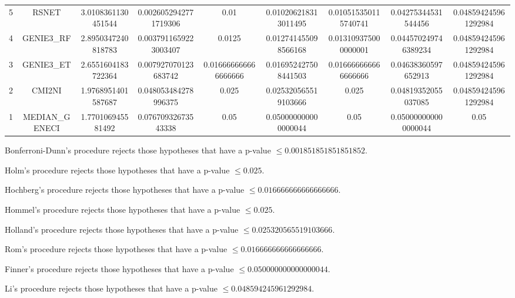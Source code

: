 \documentclass[a4paper,10pt]{article}
\begin{document}
\begin{landscape}
\begin{table}[!htp]
\begin{tabular}{ccccccccc}
5&RSNET&3.0108361130451544&0.0026052942771719306&0.01&0.010206218313011495&0.010515350115740741&0.04275344531544456&0.048594245961292984\\
4&GENIE3_RF&2.8950347240818783&0.0037911659223003407&0.0125&0.012741455098566168&0.013109375000000001&0.044570249746389234&0.048594245961292984\\
3&GENIE3_ET&2.6551604183722364&0.007927070123683742&0.016666666666666666&0.016952427508441503&0.016666666666666666&0.04638360597652913&0.048594245961292984\\
2&CMI2NI&1.9768951401587687&0.048053484278996375&0.025&0.025320565519103666&0.025&0.04819352055037085&0.048594245961292984\\
1&MEDIAN_GENECI&1.770106945581492&0.07670932673543338&0.05&0.050000000000000044&0.05&0.050000000000000044&0.05\\
\hline
\end{tabular}
\end{table}
Bonferroni-Dunn's procedure rejects those hypotheses that have a p-value $\le0.001851851851851852$.


Holm's procedure rejects those hypotheses that have a p-value $\le0.025$.


Hochberg's procedure rejects those hypotheses that have a p-value $\le0.016666666666666666$.


Hommel's procedure rejects those hypotheses that have a p-value $\le0.025$.


Holland's procedure rejects those hypotheses that have a p-value $\le0.025320565519103666$.


Rom's procedure rejects those hypotheses that have a p-value $\le0.016666666666666666$.


Finner's procedure rejects those hypotheses that have a p-value $\le0.050000000000000044$.


Li's procedure rejects those hypotheses that have a p-value $\le0.048594245961292984$.



\newpage


\end{landscape}
\end{document}
